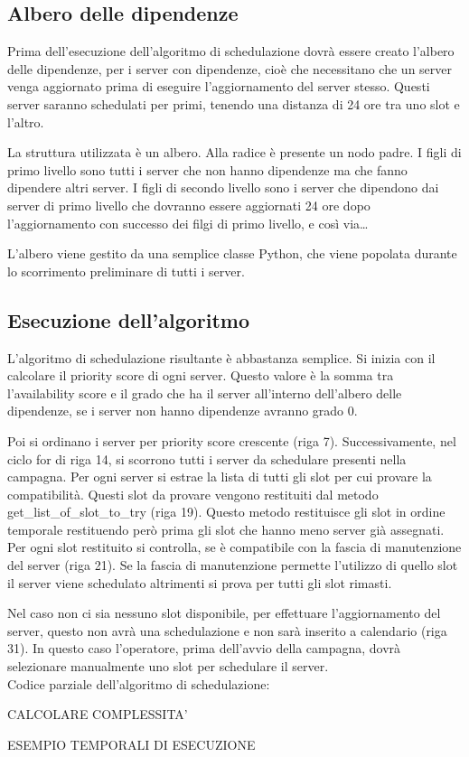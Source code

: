 \subsection{Albero delle dipendenze}
Prima dell’esecuzione dell’algoritmo di schedulazione dovrà essere creato 
l’albero delle dipendenze, per i server con dipendenze, cioè che necessitano 
che un server venga aggiornato prima di eseguire l’aggiornamento del server 
stesso. Questi server saranno schedulati per primi, tenendo una distanza di 24 
ore tra uno slot e l’altro.

La struttura utilizzata è un albero. Alla radice è presente un nodo padre. 
I figli di primo livello sono tutti i server che non hanno dipendenze ma che 
fanno dipendere altri server.
I figli di secondo livello sono i server che dipendono dai server di primo livello
che dovranno essere aggiornati 24 ore dopo l'aggiornamento con successo dei filgi 
di primo livello, e così via\dots

L’albero viene gestito da una semplice classe Python, che viene popolata durante 
lo scorrimento preliminare di tutti i server.


\subsection{Esecuzione dell’algoritmo}
L’algoritmo di schedulazione risultante è abbastanza semplice. 
Si inizia con il calcolare il priority score di ogni server.
Questo valore è la somma tra l’availability score e il grado che 
ha il server all'interno dell’albero delle dipendenze, se i server non 
hanno dipendenze avranno grado 0.

Poi si ordinano i server per priority score crescente (riga 7).
Successivamente, nel ciclo for di riga 14, si scorrono tutti i server 
da schedulare presenti nella campagna.
Per ogni server si estrae la lista di tutti gli slot per cui provare 
la compatibilità. Questi slot da provare vengono restituiti dal metodo 
get\_list\_of\_slot\_to\_try (riga 19). Questo metodo restituisce gli slot 
in ordine temporale restituendo però prima gli slot che hanno meno server 
già assegnati.
Per ogni slot restituito si controlla, se è compatibile con la fascia di 
manutenzione del server (riga 21). Se la fascia di manutenzione permette 
l’utilizzo di quello slot il server viene schedulato altrimenti si prova 
per tutti gli slot rimasti.

Nel caso non ci sia nessuno slot disponibile, per effettuare 
l’aggiornamento del server, questo non avrà una schedulazione e non sarà 
inserito a calendario (riga 31). In questo caso l’operatore, prima 
dell’avvio della campagna, dovrà selezionare manualmente uno slot per 
schedulare il server.\\

Codice parziale dell'algoritmo di schedulazione:


CALCOLARE COMPLESSITA'

ESEMPIO TEMPORALI DI ESECUZIONE
